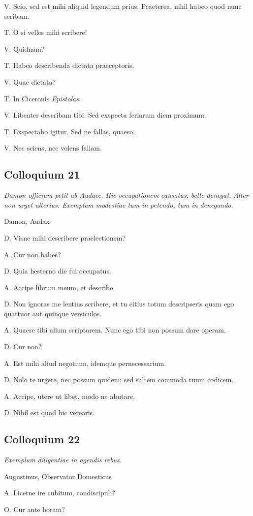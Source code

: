 \documentclass{article}
\begin{document}
V. Scio, sed est mihi aliquid legendum prius. Praeterea, nihil habeo quod nunc scribam.

T. O si velles mihi scribere!

V. Quidnam?

T. Habeo describenda dictata praeceptoris.

V. Quae dictata?

T. In Ciceronis \emph{Epistolas}.

V. Libenter describam tibi. Sed exspecta feriarum diem proximum.

T. Exspectabo igitur. Sed ne fallas, quaeso.

V. Nec sciens, nec volens fallam.

\subsection{Colloquium 21}
\emph{Damon officium petit ab Audace. Hic occupationem causatus, belle denegat. Alter non urget ulterius. Exemplum modestiae tum in petendo, tum in denegando.}

Damon, Audax

D. Visne mihi describere praelectionem?

A. Cur non habes?

D. Quia hesterno die fui occupatus.

A. Accipe librum meum, et describe.

 
D. Non ignoras me lentius scribere, et tu citius totum descripseris quam ego quattuor aut quinque versiculos.

A. Quaere tibi alium scriptorem. Nunc ego tibi non possum dare operam.

D. Cur non?

A. Est mihi aliud negotium, idemque pernecessarium.

D. Nolo te urgere, nec possum quidem: sed saltem commoda tuum codicem.

A. Accipe, utere ut libet, modo ne abutare. 

D. Nihil est quod hic verearis.

\subsection{Colloquium 22}
\emph{Exemplum diligentiae in agendis rebus.}

Augustinus, Observator Domesticus

A. Licetne ire cubitum, condiscipuli?

O. Cur ante horam?
\end{document}
